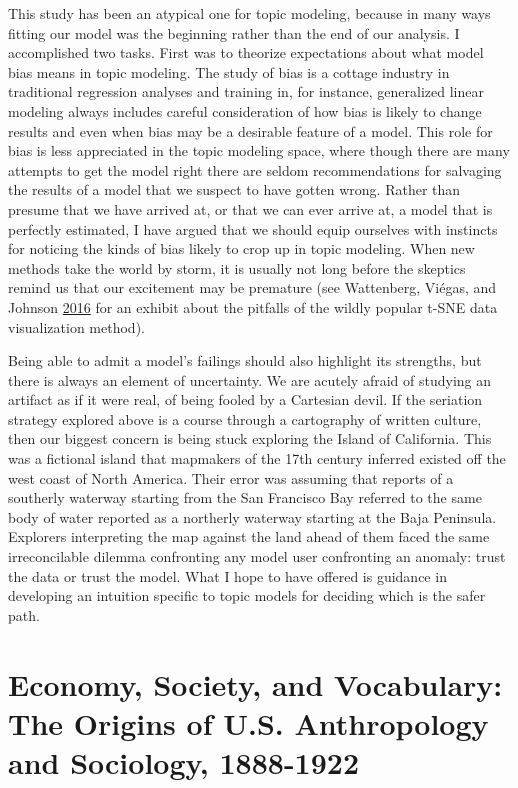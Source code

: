 \documentclass[]{book}
\theoremstyle{definition}
\theoremstyle{definition}
\theoremstyle{definition}
\theoremstyle{remark}
\begin{document}
This study has been an atypical one for topic modeling, because in many
ways fitting our model was the beginning rather than the end of our
analysis. I accomplished two tasks. First was to theorize expectations
about what model bias means in topic modeling. The study of bias is a
cottage industry in traditional regression analyses and training in, for
instance, generalized linear modeling always includes careful
consideration of how bias is likely to change results and even when bias
may be a desirable feature of a model. This role for bias is less
appreciated in the topic modeling space, where though there are many
attempts to get the model right there are seldom recommendations for
salvaging the results of a model that we suspect to have gotten wrong.
Rather than presume that we have arrived at, or that we can ever arrive
at, a model that is perfectly estimated, I have argued that we should
equip ourselves with instincts for noticing the kinds of bias likely to
crop up in topic modeling. When new methods take the world by storm, it
is usually not long before the skeptics remind us that our excitement
may be premature (see Wattenberg, Viégas, and Johnson
\protect\hyperlink{ref-Wattenberg2016How}{2016} for an exhibit about the
pitfalls of the wildly popular t-SNE data visualization method).

Being able to admit a model's failings should also highlight its
strengths, but there is always an element of uncertainty. We are acutely
afraid of studying an artifact as if it were real, of being fooled by a
Cartesian devil. If the seriation strategy explored above is a course
through a cartography of written culture, then our biggest concern is
being stuck exploring the Island of California. This was a fictional
island that mapmakers of the 17th century inferred existed off the west
coast of North America. Their error was assuming that reports of a
southerly waterway starting from the San Francisco Bay referred to the
same body of water reported as a northerly waterway starting at the Baja
Peninsula. Explorers interpreting the map against the land ahead of them
faced the same irreconcilable dilemma confronting any model user
confronting an anomaly: trust the data or trust the model. What I hope
to have offered is guidance in developing an intuition specific to topic
models for deciding which is the safer path.

\hypertarget{voc}{%
\chapter{Economy, Society, and Vocabulary: The Origins of U.S.
Anthropology and Sociology, 1888-1922}\label{voc}}
\end{document}
